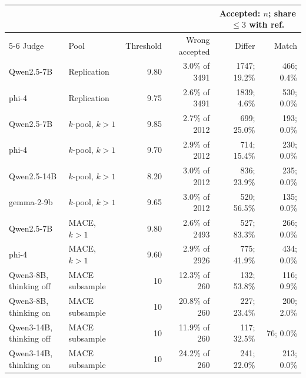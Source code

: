 \begin{tabular}{llrrrr}
\toprule
 & & & & \multicolumn{2}{c}{Accepted: $n$; share $\leq 3$ with ref.} \\
\cmidrule(lr){5-6}
Judge & Pool & Threshold & Wrong accepted & Differ & Match \\
\midrule
Qwen2.5-7B & Replication & 9.80 & 3.0\% of 3491 & 1747; 19.2\% & 466; 0.4\% \\
phi-4 & Replication & 9.75 & 2.6\% of 3491 & 1839; 4.6\% & 530; 0.0\% \\
Qwen2.5-7B & $k$-pool, $k{>}1$ & 9.85 & 2.7\% of 2012 & 699; 25.0\% & 193; 0.0\% \\
phi-4 & $k$-pool, $k{>}1$ & 9.70 & 2.9\% of 2012 & 714; 15.4\% & 230; 0.0\% \\
Qwen2.5-14B & $k$-pool, $k{>}1$ & 8.20 & 3.0\% of 2012 & 836; 23.9\% & 235; 0.0\% \\
gemma-2-9b & $k$-pool, $k{>}1$ & 9.65 & 3.0\% of 2012 & 520; 56.5\% & 135; 0.0\% \\
\addlinespace
Qwen2.5-7B & \textsc{MACE}, $k{>}1$ & 9.80 & 2.6\% of 2493 & 527; 83.3\% & 266; 0.0\% \\
phi-4 & \textsc{MACE}, $k{>}1$ & 9.60 & 2.9\% of 2926 & 775; 41.9\% & 434; 0.0\% \\
\addlinespace
Qwen3-8B, thinking off & \textsc{MACE} subsample & 10 & 12.3\% of 260 & 132; 53.8\% & 116; 0.9\% \\
Qwen3-8B, thinking on & \textsc{MACE} subsample & 10 & 20.8\% of 260 & 227; 23.4\% & 200; 2.0\% \\
Qwen3-14B, thinking off & \textsc{MACE} subsample & 10 & 11.9\% of 260 & 117; 32.5\% & 76; 0.0\% \\
Qwen3-14B, thinking on & \textsc{MACE} subsample & 10 & 24.2\% of 260 & 241; 22.0\% & 213; 0.0\% \\
\bottomrule
\end{tabular}
